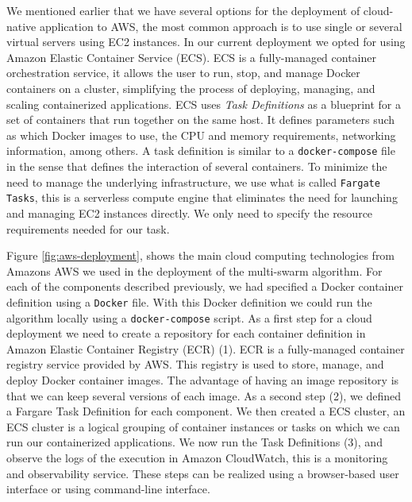 \documentclass{cys}
\begin{document}
We mentioned earlier that we have several options for the deployment of cloud-native 
application to AWS, the most common approach is to use single or several virtual servers 
using EC2 instances. In our current deployment we opted for using Amazon Elastic Container Service (ECS). 
ECS is a fully-managed container orchestration service, it allows the user to run, 
stop, and manage Docker containers on a cluster, simplifying the process of deploying, managing,
and scaling containerized applications. ECS uses \textit{Task Definitions} as a blueprint for a set of 
containers that run together on the same host. It defines parameters such as which Docker 
images to use, the CPU and memory requirements, networking information, among others.   
A task definition is similar to a \texttt{docker-compose} file in the sense that 
defines the interaction of several containers. To minimize the need to manage the
underlying infrastructure, we use what is called \texttt{Fargate Tasks}, this is a serverless
compute engine that eliminates the need for launching and managing EC2 instances
directly. %
We only need to specify the resource requirements needed for our task. 

Figure \ref{fig:aws-deployment}, shows the main cloud computing technologies from 
Amazons AWS we used in the deployment of the multi-swarm algorithm. For each of the
components described previously, we had specified a Docker container definition using 
a \texttt{Docker} file. With this Docker definition we could run the algorithm locally
using a \texttt{docker-compose} script. As a first step for a cloud deployment we need to create 
a repository for each container definition in Amazon Elastic Container Registry (ECR) (1). 
ECR is a fully-managed container registry service provided by AWS. This registry is 
used to store, manage, and deploy Docker container images. The advantage of 
having an image repository is that we can keep several versions of each image. 
As a second step (2), we defined a Fargare Task Definition for each component. We then created a
ECS cluster, an ECS cluster is a logical grouping of container instances or tasks 
on which we can run our containerized applications. We now run the Task Definitions (3),
and observe the logs of the execution in Amazon CloudWatch, this is a monitoring and observability
service. These steps can be realized using a browser-based user interface or 
using command-line interface. 
\end{document}
